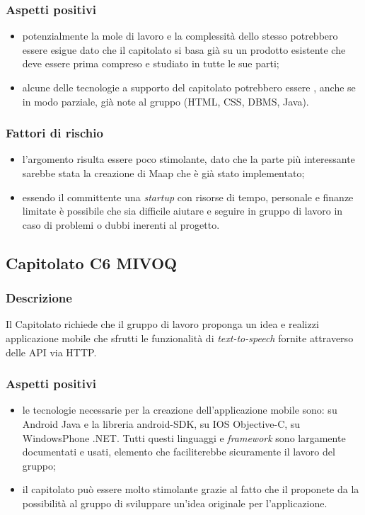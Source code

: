 \documentclass[12pt,a4paper]{article}
\begin{document}
\subsubsection{Aspetti positivi}
\begin{itemize}
\item potenzialmente la mole di lavoro e la complessità dello stesso potrebbero essere esigue dato che il capitolato si basa già su un prodotto esistente che deve essere prima compreso e studiato in tutte le sue parti;

\item alcune delle tecnologie a supporto del capitolato potrebbero essere , anche se in modo parziale, già note al gruppo (HTML, CSS, DBMS, Java).
\end{itemize}

\subsubsection{Fattori di rischio}
\begin{itemize}
\item l'argomento risulta essere poco stimolante, dato che la parte più interessante sarebbe stata la creazione di Maap che è già stato implementato;

\item essendo il committente una \textit{startup} con risorse di tempo, personale e finanze limitate è possibile che sia difficile aiutare e seguire in gruppo di lavoro in caso di problemi o dubbi inerenti al progetto.
\end{itemize}

\newpage
\subsection{Capitolato C6 MIVOQ}
\subsubsection{Descrizione}

Il Capitolato richiede che il gruppo di lavoro proponga un idea e realizzi applicazione mobile che sfrutti le funzionalità di \textit{text-to-speech} fornite attraverso delle API via HTTP.

\subsubsection{Aspetti positivi}
\begin{itemize}
 \item le tecnologie necessarie per la creazione dell'applicazione mobile sono: su Android Java e la libreria android-SDK, su IOS Objective-C, su WindowsPhone .NET. Tutti questi linguaggi e \textit{framework} sono largamente documentati e usati, elemento che faciliterebbe sicuramente il lavoro del gruppo;
 \item il capitolato può essere molto stimolante grazie al fatto che il proponete da la possibilità al gruppo di sviluppare un'idea originale per l'applicazione. 
\end{itemize}
\end{document}
